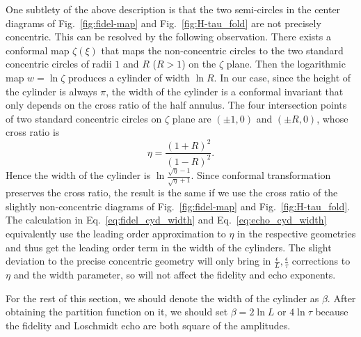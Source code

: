 One subtlety of the above description is that the two semi-circles in the center diagrams of Fig.~\ref{fig:fidel-map} and Fig.~\ref{fig:H-tau_fold} are not precisely concentric. This can be resolved by the following observation. There exists a conformal map $\zeta(\xi)$ that maps the non-concentric circles to the two standard concentric circles of radii $1$ and $R$ ($R>1$) on the $\zeta$ plane\cite{brown_complex_2009}. Then the logarithmic map $w = \ln \zeta$ produces a cylinder of width $\ln R$. In our case, since the height of the cylinder is always $\pi$, the width of the cylinder is a conformal invariant that only depends on the cross ratio of the half annulus. The four intersection points of two standard concentric circles on $\zeta$ plane are $(\pm 1,0)$ and $(\pm R,0)$, whose cross ratio is
\begin{equation}
\eta = \frac{(1 + R)^2}{(1 - R)^2}. 
\end{equation}
Hence the width of the cylinder is $\ln \frac{\sqrt{ \eta } - 1}{\sqrt{ \eta} + 1}$. Since conformal transformation preserves the cross ratio, the result is the same if we use the cross ratio of the slightly non-concentric diagrams of Fig.~\ref{fig:fidel-map} and Fig.~\ref{fig:H-tau_fold}. The calculation in Eq.~\eqref{eq:fidel_cyd_width} and Eq.~\eqref{eq:echo_cyd_width} equivalently use the leading order approximation to $\eta$ in the respective geometries and thus get the leading order term in the width of the cylinders. The slight deviation to the precise concentric geometry will only bring in $\frac{\epsilon}{L}, \frac{\epsilon}{\tau}$ corrections to $\eta$ and the width parameter, so will not affect the fidelity and echo exponents. 

For the rest of this section, we should denote the width of the cylinder as $\beta$. After obtaining the partition function on it, we should set $\beta = 2 \ln L$ or $ 4 \ln \tau$ because the fidelity and Loschmidt echo are both square of the amplitudes.

